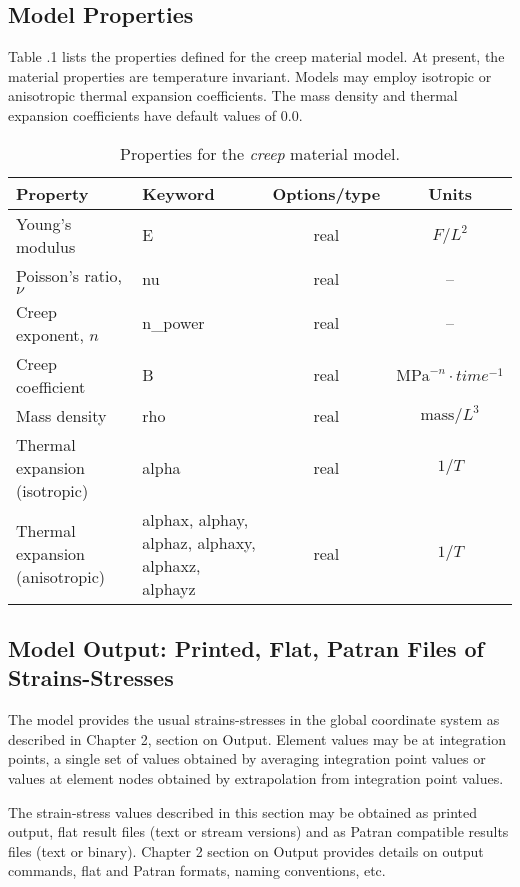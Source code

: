 \documentclass[11pt]{report}
\numberwithin{equation}{section}
\newcommand{\ti}{\emph}
\begin{document}
\subsection {Model Properties}
Table \thesection.1 lists the properties defined for the 
creep material model. At present, the material properties are temperature invariant.
Models may employ isotropic or anisotropic thermal expansion 
coefficients. The mass density and thermal expansion coefficients have default
values of 0.0.

\begin{table}[htbp]
\small
\centering
\setlength{\extrarowheight}{3pt}

\begin{tabular}{|l|>{\centering}m{3cm}|c|c|}
\hline 
\textbf{Property} & \textbf{Keyword} & \textbf{Options/type}&\textbf{Units}\tabularnewline
\hline \hline
Young's modulus & E &real&$F/L^2$\tabularnewline \hline
Poisson's ratio, $\nu$ &nu &real&--\tabularnewline \hline
Creep exponent, $n$ &n\_power & real&--\tabularnewline \hline
Creep coefficient & B & real&$\textrm{MPa}^{-n}\cdot time^{-1}$\tabularnewline \hline
Mass density	& rho & 	real & $\textrm{mass}/L^3$ \\ \hline
Thermal expansion (isotropic)	& alpha & 	real	& $1/T$ \\ \hline
Thermal expansion (anisotropic) & alphax, alphay, alphaz, alphaxy, alphaxz, alphayz & real & $1/T$ \\ \hline
\end{tabular}
\caption{Properties for the \ti{creep} material model.
\label{tab:creep_props}}
\normalsize
\end{table}


\subsection{Model Output: Printed, Flat, Patran Files of Strains-Stresses}
The model provides the usual strains-stresses in the global coordinate system
as described in Chapter 2, section on Output.
Element values may be at integration points, a single set of values obtained by 
averaging integration point values or values at element nodes obtained by
extrapolation from integration point values. 

The strain-stress values described in this section may be obtained as 
printed output, flat result files (text or stream versions) and as
Patran compatible results files (text or binary).  Chapter 2 section on Output provides 
details on output commands, flat and Patran formats, naming
conventions, etc.
\end{document}

